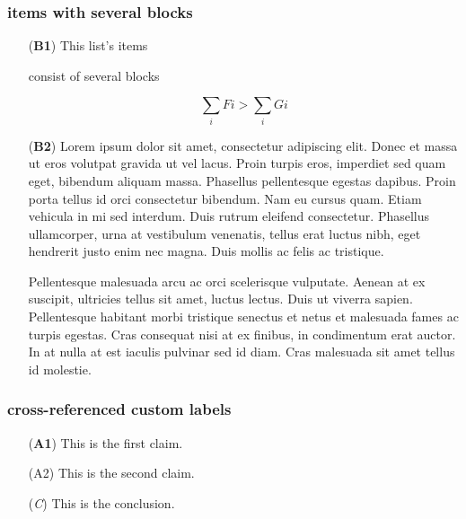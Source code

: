 \documentclass[
]{article}
\makeatletter
\providecommand{\tightlist}{%
  \setlength{\itemsep}{0pt}\setlength{\parskip}{0pt}}
\def\labelledlistlabel#1#2{\begingroup
    \def\@currentlabel{#2}%
    \label{#1}\endgroup
    }
\makeatother
\begin{document}
\hypertarget{items-with-several-blocks}{%
\subsubsection{items with several
blocks}\label{items-with-several-blocks}}

\begin{itemize}
\tightlist

\item[(\textbf{B1})] This list's items

consist of several blocks

\[\sum_i Fi > \sum_i Gi\]

\item[(\textbf{B2})] Lorem ipsum dolor sit amet, consectetur adipiscing
elit. Donec et massa ut eros volutpat gravida ut vel lacus. Proin turpis
eros, imperdiet sed quam eget, bibendum aliquam massa. Phasellus
pellentesque egestas dapibus. Proin porta tellus id orci consectetur
bibendum. Nam eu cursus quam. Etiam vehicula in mi sed interdum. Duis
rutrum eleifend consectetur. Phasellus ullamcorper, urna at vestibulum
venenatis, tellus erat luctus nibh, eget hendrerit justo enim nec magna.
Duis mollis ac felis ac tristique.

Pellentesque malesuada arcu ac orci scelerisque vulputate. Aenean at ex
suscipit, ultricies tellus sit amet, luctus lectus. Duis ut viverra
sapien. Pellentesque habitant morbi tristique senectus et netus et
malesuada fames ac turpis egestas. Cras consequat nisi at ex finibus, in
condimentum erat auctor. In at nulla at est iaculis pulvinar sed id
diam. Cras malesuada sit amet tellus id molestie.

\end{itemize}

\hypertarget{cross-referenced-custom-labels}{%
\subsubsection{cross-referenced custom
labels}\label{cross-referenced-custom-labels}}

\begin{itemize}
\tightlist

\item[(\textbf{A1})\labelledlistlabel{A1ref}{\textbf{A1}}] This is the
first claim.

\item[(A2)\labelledlistlabel{A2ref}{A2}] This is the second claim.

\item[(\emph{C})\labelledlistlabel{Cref}{\emph{C}}] This is the
conclusion.

\end{itemize}
\end{document}
